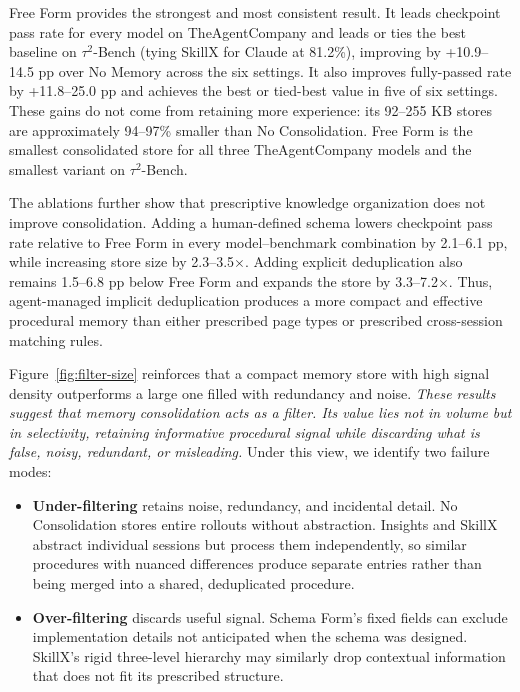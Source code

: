 Free Form \method{} provides the strongest and most consistent result. It leads
checkpoint pass rate for every model on TheAgentCompany and leads or ties the
best baseline on $\tau^2$-Bench (tying SkillX for Claude at 81.2\%), improving
by +10.9--14.5 pp over No Memory across the six settings. It also improves
fully-passed rate by +11.8--25.0 pp and achieves the best or tied-best value
in five of six settings. These gains do not come from retaining more
experience: its 92--255 KB stores are approximately 94--97\% smaller than No
Consolidation. Free Form is the smallest consolidated store for all three
TheAgentCompany models and the smallest \method{} variant on $\tau^2$-Bench.

The \method{} ablations further show that prescriptive knowledge organization
does not improve consolidation. Adding a human-defined schema lowers checkpoint
pass rate relative to Free Form in every model--benchmark combination by
2.1--6.1 pp, while increasing store size by 2.3--3.5$\times$. Adding explicit
deduplication also remains 1.5--6.8 pp below Free Form and expands the store by
3.3--7.2$\times$. Thus, agent-managed implicit deduplication produces a more
compact and effective procedural memory than either prescribed page types or
prescribed cross-session matching rules.

Figure~\ref{fig:filter-size} reinforces that a compact memory store with high signal density outperforms a large one
filled with redundancy and noise. \emph{These results
suggest that memory consolidation acts as a filter. Its value lies not in
volume but in selectivity, retaining informative procedural signal while
discarding what is false, noisy, redundant, or misleading.} Under this view,
we identify two failure modes:

\begin{itemize}[leftmargin=*,itemsep=2pt,topsep=3pt]
    \item \textbf{Under-filtering} retains noise, redundancy, and incidental
    detail. No Consolidation stores entire rollouts without abstraction.
    Insights and SkillX abstract individual sessions but process them
    independently, so similar procedures with nuanced differences produce
    separate entries rather than being merged into a shared, deduplicated
    procedure.
    \item \textbf{Over-filtering} discards useful signal. Schema Form's fixed
    fields can exclude implementation details not anticipated when the schema
    was designed. SkillX's rigid three-level hierarchy may similarly drop
    contextual information that does not fit its prescribed structure.
\end{itemize}

